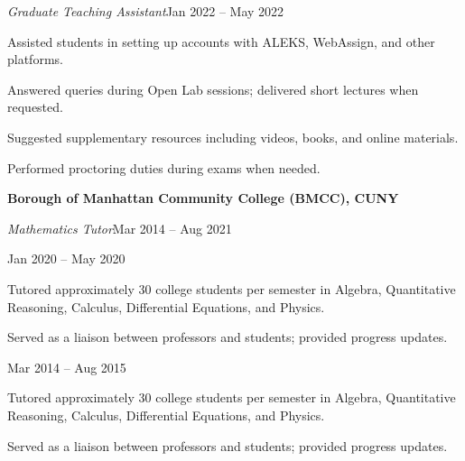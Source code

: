 \documentclass[a4paper, 12pt]{article}
\newcommand{\workplace}[1]{%
  \noindent\textbf{#1}\par
}
\newcommand{\workrole}[2]{%
  \noindent\hspace*{1em}\textit{#1}\hfill #2\par
}
\newcommand{\workunit}[1]{%
  \noindent\hspace*{1em}{\small\itshape #1}\par
}
\newcommand{\workassignment}[2]{%
  \noindent\hspace*{2em}{\small\itshape #1}\hfill{\small #2}\par
}
\begin{document}
\begin{flushleft}
\noindent\begin{minipage}{\linewidth}
\workrole{Graduate Teaching Assistant}{Jan 2022 -- May 2022}
\workunit{Mathematics Assistance \& Learning Lab (MALL)}
\begin{compactitem}
    \item Assisted students in setting up accounts with ALEKS, WebAssign, and other platforms.
    \item Answered queries during Open Lab sessions; delivered short lectures when requested.
    \item Suggested supplementary resources including videos, books, and online materials.
    \item Performed proctoring duties during exams when needed.
\end{compactitem}
\end{minipage}

\vspace{8pt}

\noindent\begin{minipage}{\linewidth}
\workplace{Borough of Manhattan Community College (BMCC), CUNY}
\workrole{Mathematics Tutor}{Mar 2014 -- Aug 2021}
\workunit{Primary role --- Department of Mathematics}
\workassignment{ASAP Program}{Jan 2020 -- May 2020}
\begin{compactitem}
    \item Tutored approximately 30 college students per semester in Algebra, Quantitative
          Reasoning, Calculus, Differential Equations, and Physics.
    \item Served as a liaison between professors and students; provided progress updates.
\end{compactitem}
\end{minipage}

\vspace{4pt}

\noindent\begin{minipage}{\linewidth}
\workassignment{Math Lab}{Mar 2014 -- Aug 2015}
\begin{compactitem}
    \item Tutored approximately 30 college students per semester in Algebra, Quantitative
          Reasoning, Calculus, Differential Equations, and Physics.
    \item Served as a liaison between professors and students; provided progress updates.
\end{compactitem}
\end{minipage}


\end{flushleft}
\end{document}
